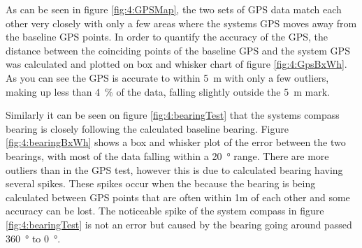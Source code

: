 As can be seen in figure \ref{fig:4:GPSMap}, the two sets of GPS data match each other very closely with only a few areas where the systems GPS moves away from the baseline GPS points. In order to quantify the accuracy of the GPS, the distance between the coinciding points of the baseline GPS and the system GPS was calculated and plotted on box and whisker chart of figure \ref{fig:4:GpsBxWh}. As you can see the GPS is accurate to within \SI{5}{\meter} with only a few outliers, making up less than \SI{4}{\percent} of the data, falling slightly outside the \SI{5}{\meter} mark.\par
Similarly it can be seen on figure \ref{fig:4:bearingTest} that the systems compass bearing is closely following the calculated baseline bearing. Figure \ref{fig:4:bearingBxWh} shows a box and whisker plot of the error between the two bearings, with most of the data falling within a \SI{20}{\degree} range. There are more outliers than in the GPS test, however this is due to calculated bearing having several spikes. These spikes occur when the because the bearing is being calculated between GPS points that are often within 1m of each other and some accuracy can be lost. The noticeable spike of the system compass in figure \ref{fig:4:bearingTest} is not an error but caused by the bearing going around passed \SI{360}{\degree} to \SI{0}{\degree}.
